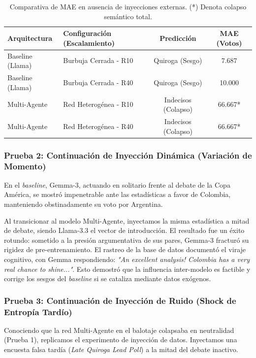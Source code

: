 ﻿\documentclass{article}
\begin{document}
\begin{table}[H]
    \centering
    \begin{tabular}{@{}llcc@{}}
        \toprule
        \textbf{Arquitectura} & \textbf{Configuración (Escalamiento)} & \textbf{Predicción} & \textbf{MAE (Votos)} \\ \midrule
        Baseline (Llama) & Burbuja Cerrada - R10 & Quiroga (Sesgo) & 7.687 \\
        Baseline (Llama) & Burbuja Cerrada - R40 & Quiroga (Sesgo) & 10.000 \\
        Multi-Agente & Red Heterogénea - R10 & Indecisos (Colapso) & 66.667* \\
        Multi-Agente & Red Heterogénea - R40 & Indecisos (Colapso) & 66.667* \\ \bottomrule
    \end{tabular}
    \caption{Comparativa de MAE en ausencia de inyecciones externas. (*) Denota colapso semántico total.}
    \label{tab:mae_collapse}
\end{table}

\subsubsection{Prueba 2: Continuación de Inyección Dinámica (Variación de Momento)}

En el \textit{baseline}, Gemma-3, actuando en solitario frente al debate de la Copa América, se mostró impenetrable ante las estadísticas a favor de Colombia, manteniendo obstinadamente su voto por Argentina.

Al transicionar al modelo Multi-Agente, inyectamos la misma estadística a mitad de debate, siendo Llama-3.3 el vector de introducción. El resultado fue un éxito rotundo: sometido a la presión argumentativa de sus pares, Gemma-3 fracturó su rigidez de pre-entrenamiento. El rastreo de la base de datos documentó el viraje cognitivo, con Gemma respondiendo: \textit{"An excellent analysis! Colombia has a very real chance to shine..."}. Esto demostró que la influencia inter-modelo es factible y corrige los sesgos del \textit{baseline} si se cataliza mediante datos exógenos.

\subsubsection{Prueba 3: Continuación de Inyección de Ruido (Shock de Entropía Tardío)}

Conociendo que la red Multi-Agente en el balotaje colapsaba en neutralidad (Prueba 1), replicamos el experimento de inyección de datos. Inyectamos una encuesta falsa tardía (\textit{Late Quiroga Lead Poll}) a la mitad del debate inactivo.
\end{document}
